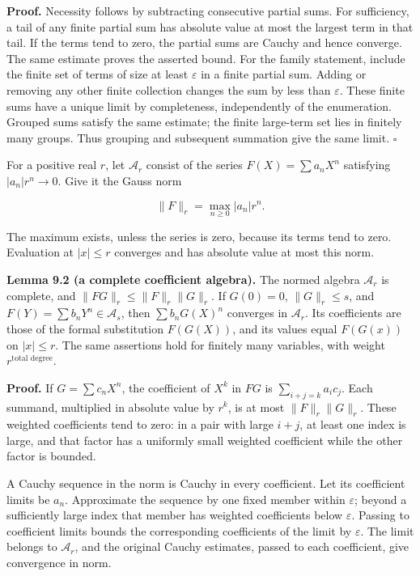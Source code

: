 \documentclass[
  11pt,
  a4paper,
]{article}
\begin{document}
\textbf{Proof.} Necessity follows by subtracting consecutive partial
sums. For sufficiency, a tail of any finite partial sum has absolute
value at most the largest term in that tail. If the terms tend to zero,
the partial sums are Cauchy and hence converge. The same estimate proves
the asserted bound. For the family statement, include the finite set of
terms of size at least \(\varepsilon\) in a finite partial sum. Adding
or removing any other finite collection changes the sum by less than
\(\varepsilon\). These finite sums have a unique limit by completeness,
independently of the enumeration. Grouped sums satisfy the same
estimate; the finite large-term set lies in finitely many groups. Thus
grouping and subsequent summation give the same limit. \(\square\)

For a positive real \(r\), let \(\mathcal A_r\) consist of the series
\(F(X)=\sum a_nX^n\) satisfying \(|a_n|r^n\to0\). Give it the Gauss norm

\[
\|F\|_r=\max_{n\ge0}|a_n|r^n.
\tag{9.3}
\]

The maximum exists, unless the series is zero, because its terms tend to
zero. Evaluation at \(|x|\le r\) converges and has absolute value at
most this norm.

\textbf{Lemma 9.2 (a complete coefficient algebra).} The normed algebra
\(\mathcal A_r\) is complete, and \(\|FG\|_r\le\|F\|_r\|G\|_r\). If
\(G(0)=0\), \(\|G\|_r\le s\), and \(F(Y)=\sum b_nY^n\in\mathcal A_s\),
then \(\sum b_nG(X)^n\) converges in \(\mathcal A_r\). Its coefficients
are those of the formal substitution \(F(G(X))\), and its values equal
\(F(G(x))\) on \(|x|\le r\). The same assertions hold for finitely many
variables, with weight \(r^{\text{total degree}}\).

\textbf{Proof.} If \(G=\sum c_nX^n\), the coefficient of \(X^k\) in
\(FG\) is \(\sum_{i+j=k}a_ic_j\). Each summand, multiplied in absolute
value by \(r^k\), is at most \(\|F\|_r\|G\|_r\). These weighted
coefficients tend to zero: in a pair with large \(i+j\), at least one
index is large, and that factor has a uniformly small weighted
coefficient while the other factor is bounded.

A Cauchy sequence in the norm is Cauchy in every coefficient. Let its
coefficient limits be \(a_n\). Approximate the sequence by one fixed
member within \(\varepsilon\); beyond a sufficiently large index that
member has weighted coefficients below \(\varepsilon\). Passing to
coefficient limits bounds the corresponding coefficients of the limit by
\(\varepsilon\). The limit belongs to \(\mathcal A_r\), and the original
Cauchy estimates, passed to each coefficient, give convergence in norm.
\end{document}
